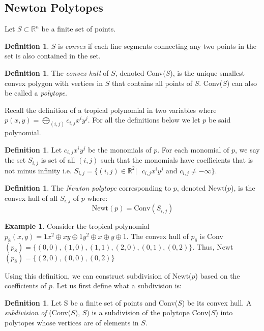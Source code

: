\documentclass[]{article}
\theoremstyle{definition}
\numberwithin{equation}{section}
\newtheorem{defn}[thm]{Definition}
\newtheorem{examp}[thm]{Example}
\renewcommand{\.}{\,.}
\begin{document}
\subsection{Newton Polytopes}
\hspace{3mm} Let $S\subset \mathbb{R}^n$ be a finite set of points.
\begin{defn} $S$ is \emph{convex} if each line segments connecting any two points in the set is also contained in the set.
\end{defn}
\begin{defn} The \emph{convex hull} of $S$, denoted Conv($S$), is the unique smallest convex polygon with vertices in $S$ that contains all points of $S$. Conv($S$) can also be called a \emph{polytope}.
\end{defn}
\hspace{3mm} Recall the definition of a tropical polynomial in two variables where $p(x,y)=\bigoplus_{(i,j)}c_{i,j}x^i y^j$. For all the definitions below we let $p$ be said polynomial. 
\begin{defn}
	Let $c_{i,j}x^i y^j$ be the monomials of $p$. For each monomial of $p$, we say the set $S_{i,j}$ is set of all $(i,j)$ such that the monomials have coefficients that is not minus infinity  i.e. $S_{i,j}=\{(i,j)\in \mathbb{R}^2|\textrm{ }c_{i,j}x^i y^j \textrm{ and }c_{i,j}\neq-\infty\}$. 
\end{defn}
\begin{defn}
	 The \emph{Newton polytope} corresponding to $p$, denoted Newt($p$), is the convex hull of all $S_{i,j}$ of $p$ where:
 \begin{equation}\label{wee}
	  \textrm{Newt}(p)= \textrm{Conv}({S_{i,j}})
	  \end{equation} 
\end{defn}
\begin{examp} Consider the tropical polynomial $p_8(x,y)=1x^2 \oplus xy \oplus 1y^2 \oplus x\oplus y \oplus 1$. The convex hull of $p_8$ is Conv$(p_8)=\{(0,0),(1, 0),(1,1),(2,0),(0,1),(0,2)\}$. Thus, Newt$(p_8)=\{(2,0),(0,0),(0,2)\}$
	\end{examp}
\hspace{3mm} Using this definition, we can construct subdivision of Newt($p$) based on the coefficients of $p$. Let us first define what a subdivision is:
\begin{defn}
	Let S be a finite set of points and Conv($S$) be its convex hull. A \emph{subdivision of }(Conv($S$), $S$) is a subdivision of the polytope Conv($S$) into polytopes whose vertices are of elements in $S$. 
\end{defn}
\end{document}
